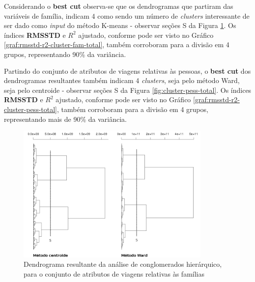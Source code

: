 Considerando o \textbf{best cut} observa-se que os dendrogramas que partiram das variáveis de família, indicam 4 como sendo um número de \textit{clusters} interessante de ser dado como \textit{input} do método K-means - observar seções S da Figura \ref{fig:cluster-fam-total}. Os índices \textbf{RMSSTD} e \textbf{$R^2$} ajustado, conforme pode ser visto no Gráfico \ref{graf:rmsstd-r2-cluster-fam-total}, também corroboram para a divisão em 4 grupos, representando 90\% da variância.

Partindo do conjunto de atributos de viagens relativas às pessoas, o \textbf{best cut} dos dendrogramas resultantes também indicam 4 \textit{clusters}, seja pelo método Ward, seja pelo centroide - observar seções S da Figura \ref{fig:cluster-pess-total}. Os índices \textbf{RMSSTD} e \textbf{$R^2$} ajustado, conforme pode ser visto no Gráfico \ref{graf:rmsstd-r2-cluster-pess-total}, também corroboram para a divisão em 4 grupos, representando mais de 90\% da variância.

\begin{figure}[htb]%
    \caption{\label{fig:cluster-fam-total}Dendrograma resultante da análise de conglomerados hierárquico, para o conjunto de atributos de viagens relativas às famílias}%
    \begin{center}%
        \includegraphics[width=0.85\textwidth]{./imagens/dendro-hierarq-cluster-familia-total-final.png}%
    \end{center}%
\end{figure}%

